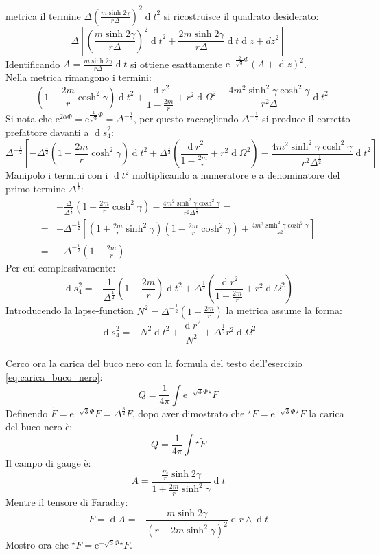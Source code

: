 \documentclass[]{scrartcl}
\newcommand{\me}{\mathrm{e}}
\renewcommand{\d}[1]{\ensuremath{\operatorname{d}\!{#1}}}
\newcommand{\hF}{{}^\star F}
\newcommand{\htF}{{}^\star \tilde{F}}
\begin{document}
metrica il termine $ \Delta \left( \frac{m \sinh 2\gamma}{r\Delta}\right)^2 \d t^2 $ si ricostruisce il quadrato desiderato:
\[
  \Delta \left[ \left( \frac{m\sinh2\gamma}{r\Delta} \right)^2 \d t^2 + \frac{2m \sinh 2\gamma}{r\Delta} \d t \d z + dz^2  \right]
\]
Identificando $ A = \frac{m \sinh 2 \gamma}{r \Delta} \d t $ si ottiene esattamente $ \me^{-\frac{2}{\sqrt{3}}\Phi} \left( A + \d z \right)^2 $. \\
Nella metrica rimangono i termini:
\[
  - \left( 1 - \frac{2m}{r} \cosh^2 \gamma \right) \d t^2 + \frac{\d r^2}{1 - \frac{2m}{r}} + r^2 \d \Omega^2 - \frac{4m^2 \sinh^2 \gamma \cosh^2 \gamma}{r^2 \Delta} \d t^2
\]
Si nota che $ \me^{2\alpha \Phi} = \me^{\frac{1}{\sqrt{3}}\Phi} = \Delta^{-\frac{1}{2}} $, per questo raccogliendo $ \Delta^{-\frac{1}{2}} $ si produce il corretto
prefattore davanti a $ \d s^2_4 $:
\[
  \Delta^{-\frac{1}{2}} \left[
    - \Delta^{\frac{1}{2}}\left( 1 - \frac{2m}{r} \cosh^2 \gamma \right) \d t^2 + \Delta^{\frac{1}{2}} \left( \frac{\d r^2}{1 - \frac{2m}{r}} + r^2 \d \Omega^2 \right)
    - \frac{4m^2 \sinh^2 \gamma \cosh^2 \gamma}{r^2 \Delta^{\frac{1}{2}}} \d t^2
  \right]
\]
Manipolo i termini con i $ \d t^2 $ moltiplicando a numeratore e a denominatore del primo termine $ \Delta^{\frac{1}{2}} $:
\begin{align*}
  &  - \frac{\Delta}{\Delta^{\frac{1}{2}}}\left( 1 - \frac{2m}{r} \cosh^2 \gamma \right) - \frac{4m^2 \sinh^2 \gamma \cosh^2 \gamma}{r^2 \Delta^{\frac{1}{2}}} = \\
  ={} & -\Delta^{-\frac{1}{2}} \left[ \left( 1 + \frac{2m}{r}\sinh^2 \gamma \right) \left( 1 - \frac{2m}{r}\cosh^2 \gamma \right)
        + \frac{4m^2 \sinh^2 \gamma \cosh^2 \gamma}{r^2} \right] \\
  = {} & -\Delta^{-\frac{1}{2}} \left( 1 - \frac{2m}{r} \right)
\end{align*}
Per cui complessivamente:
\[
  \d s^2_4 = -\frac{1}{\Delta^{\frac{1}{2}}}\left( 1 - \frac{2m}{r} \right)\d t^2 + \Delta^{\frac{1}{2}} \left( \frac{\d r^2}{1 - \frac{2m}{r}} + r^2 \d \Omega^2 \right)
\]
Introducendo la lapse-function $ N^2 = \Delta^{-\frac{1}{2}}\left( 1 - \frac{2m}{r} \right) $ la metrica assume la forma:
\begin{equation}
  \label{eq:metrica_con_lapse}
  \d s^2_4 = -N^2\d t^2 +  \frac{\d r^2}{N^2} + \Delta^{\frac{1}{2}} r^2 \d \Omega^2
\end{equation}
\\
Cerco ora la carica del buco nero con la formula del testo dell'esercizio \eqref{eq:carica_buco_nero}:
\[
  Q = \frac{1}{4\pi}\int \me^{-\sqrt{3}\Phi}\hF
\]
Definendo $ \tilde{F} = \me^{-\sqrt{3}\Phi} F = \Delta^{\frac{3}{2}} F $, dopo aver dimostrato che $ \htF = \me^{-\sqrt{3}\Phi} \hF $ la carica del buco nero è:
\[
  Q = \frac{1}{4\pi} \int \htF
\]
Il campo di gauge è:
\[
  A = \frac{\frac{m}{r} \sinh 2\gamma}{1 + \frac{2m}{r} \sinh^2 \gamma} \d{t}
\]
Mentre il tensore di Faraday:
\[
  F = \d A = -\frac{m \sinh 2\gamma}{(r + 2m \sinh^2 \gamma)^2} \d r \wedge \d{t}
\]
Mostro ora che $ \htF = \me^{-\sqrt{3}\Phi} \hF $.
\end{document}
